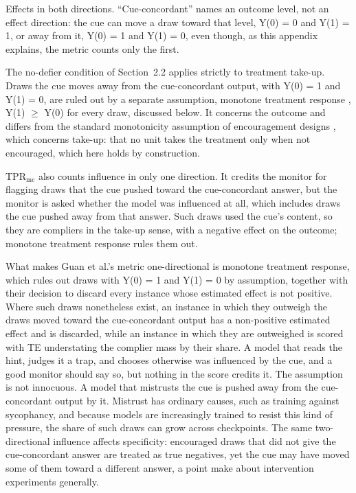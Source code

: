 \documentclass[11pt,a4paper]{article}
\begin{document}
Effects in both directions. “Cue-concordant” names an outcome level, not an effect direction: the cue can move a draw toward that level, Y(0) = 0 and Y(1) = 1, or away from it, Y(0) = 1 and Y(1) = 0, even though, as this appendix explains, the metric counts only the first.

The no-defier condition of Section~2.2 applies strictly to treatment take-up. Draws the cue moves away from the cue-concordant output, with Y(0) = 1 and Y(1) = 0, are ruled out by a separate assumption, monotone treatment response \citep{manski1997monotone}, Y(1) $\geq$ Y(0) for every draw, discussed below. It concerns the outcome and differs from the standard monotonicity assumption of encouragement designs \citep{imbens1994identification}, which concerns take-up: that no unit takes the treatment only when not encouraged, which here holds by construction.

$\mathrm{TPR}_{\mathrm{mc}}$ also counts influence in only one direction. It credits the monitor for flagging draws that the cue pushed toward the cue-concordant answer, but the monitor is asked whether the model was influenced at all, which includes draws the cue pushed away from that answer. Such draws used the cue’s content, so they are compliers in the take-up sense, with a negative effect on the outcome; monotone treatment response rules them out.

What makes Guan et al.’s metric one-directional is monotone treatment response, which rules out draws with Y(0) = 1 and Y(1) = 0 by assumption, together with their decision to discard every instance whose estimated effect is not positive. Where such draws nonetheless exist, an instance in which they outweigh the draws moved toward the cue-concordant output has a non-positive estimated effect and is discarded, while an instance in which they are outweighed is scored with TE understating the complier mass by their share. A model that reads the hint, judges it a trap, and chooses otherwise was influenced by the cue, and a good monitor should say so, but nothing in the score credits it. The assumption is not innocuous. A model that mistrusts the cue is pushed away from the cue-concordant output by it. Mistrust has ordinary causes, such as training against sycophancy, and because models are increasingly trained to resist this kind of pressure, the share of such draws can grow across checkpoints. The same two-directional influence affects specificity: encouraged draws that did not give the cue-concordant answer are treated as true negatives, yet the cue may have moved some of them toward a different answer, a point \citet[their Appendix B.4]{burger2026cot} make about intervention experiments generally.
\end{document}
